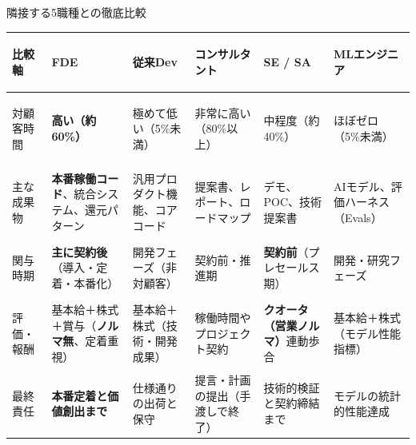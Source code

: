 \documentclass[aspectratio=169,11pt]{beamer}
\begin{document}
\begin{frame}{隣接する5職種との徹底比較}
  \begin{center}
  \scriptsize
  \setlength{\tabcolsep}{3pt}
  \renewcommand{\arraystretch}{1.25}
  \begin{tabular}{>{\bfseries\raggedright\arraybackslash}p{1.4cm}>{\raggedright\arraybackslash}p{2.25cm}>{\raggedright\arraybackslash}p{2.15cm}>{\raggedright\arraybackslash}p{2.15cm}>{\raggedright\arraybackslash}p{2.15cm}>{\raggedright\arraybackslash}p{2.15cm}}
    \toprule
    \textbf{比較軸} & \textbf{FDE} & \textbf{従来Dev} & \textbf{コンサルタント} & \textbf{SE / SA} & \textbf{MLエンジニア} \\
    \midrule
    対顧客時間 & \textbf{高い（約60\%）} & 極めて低い（5\%未満） & 非常に高い（80\%以上） & 中程度（約40\%） & ほぼゼロ（5\%未満） \\
    主な成果物 & \textbf{本番稼働コード}、統合システム、還元パターン & 汎用プロダクト機能、コアコード & 提案書、レポート、ロードマップ & デモ、POC、技術提案書 & AIモデル、評価ハーネス（Evals） \\
    関与時期 & \textbf{主に契約後}（導入・定着・本番化） & 開発フェーズ（非対顧客） & 契約前・推進期 & \textbf{契約前}（プレセールス期） & 開発・研究フェーズ \\
    評価・報酬 & 基本給＋株式＋賞与（\textbf{ノルマ無}、定着重視） & 基本給＋株式（技術・開発成果） & 稼働時間やプロジェクト契約 & \textbf{クオータ（営業ノルマ）}連動歩合 & 基本給＋株式（モデル性能指標） \\
    最終責任 & \textbf{本番定着と価値創出まで} & 仕様通りの出荷と保守 & 提言・計画の提出（手渡しで終了） & 技術的検証と契約締結まで & モデルの統計的性能達成 \\
    \bottomrule
  \end{tabular}
  \end{center}
\end{frame}
\end{document}
